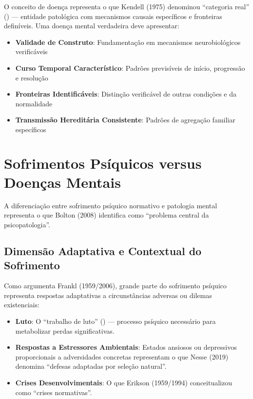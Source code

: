O conceito de doença representa o que Kendell (1975) denominou \enquote{categoria real} () --- entidade patológica com mecanismos causais específicos e fronteiras definíveis. Uma doença mental verdadeira deve apresentar:

\begin{itemize}
\item \textbf{Validade de Construto}: Fundamentação em mecanismos neurobiológicos verificáveis
\item \textbf{Curso Temporal Característico}: Padrões previsíveis de início, progressão e resolução
\item \textbf{Fronteiras Identificáveis}: Distinção verificável de outras condições e da normalidade
\item \textbf{Transmissão Hereditária Consistente}: Padrões de agregação familiar específicos
\end{itemize}

\section{Sofrimentos Psíquicos versus Doenças Mentais}
\label{sec:sofrimento-vs-doenca}

A diferenciação entre sofrimento psíquico normativo e patologia mental representa o que Bolton (2008) identifica como \enquote{problema central da psicopatologia}.

\subsection{Dimensão Adaptativa e Contextual do Sofrimento}

Como argumenta Frankl (1959/2006), grande parte do sofrimento psíquico representa respostas adaptativas a circunstâncias adversas ou dilemas existenciais:

\begin{itemize}
\item \textbf{Luto}: O \enquote{trabalho de luto} () --- processo psíquico necessário para metabolizar perdas significativas.

\item \textbf{Respostas a Estressores Ambientais}: Estados ansiosos ou depressivos proporcionais a adversidades concretas representam o que Nesse (2019) denomina \enquote{defesas adaptadas por seleção natural}.

\item \textbf{Crises Desenvolvimentais}: O que Erikson (1959/1994) conceitualizou como \enquote{crises normativas}.
\end{itemize}

